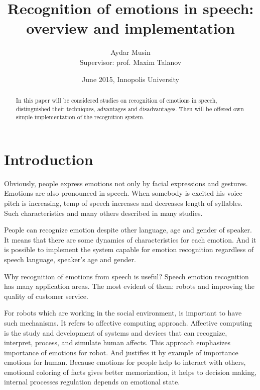 \documentclass[12pt, letterpaper]{article}
\title{Recognition of emotions in speech:\\overview and implementation}
\author{Aydar Musin\\Supervisor: prof. Maxim Talanov}
\date{June 2015, Innopolis University}
\begin{document}
\begin{titlepage}
\maketitle
\end{titlepage}

\begin{abstract}
In this paper will be considered studies on recognition of emotions in speech, distinguished their techniques, advantages and disadvantages. Then will be offered own simple implementation of the recognition system.
\end{abstract}

\section{Introduction}
Obviously, people express emotions not only by facial expressions and gestures. Emotions are also pronounced in speech. When somebody is excited his voice pitch is increasing, temp of speech increases and decreases length of syllables. Such characteristics and many others described in many studies. 

People can recognize emotion despite other language, age and gender of speaker. It means that there are some dynamics of characteristics for each emotion. And it is possible to implement the system capable for emotion recognition regardless of speech language, speaker's age and gender.

Why recognition of emotions from speech is useful? Speech emotion recognition has many application areas. The most evident of them: robots and improving the quality of customer service.

For robots which are working in the social environment, is important to have such mechanisms. It refers to affective computing approach. Affective computing is the study and development of systems and devices that can recognize, interpret, process, and simulate human affects\cite{affective}. This approach emphasizes importance of emotions for robot. And justifies it by example of importance emotions for human. Because emotions for people help to interact with others, emotional coloring of facts gives better memorization, it helps to decision making, internal processes regulation depends on emotional state.
\end{document}
